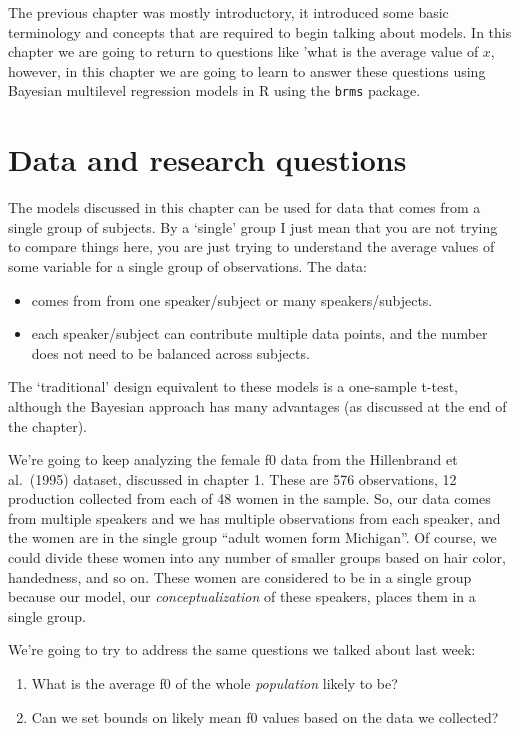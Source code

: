 \documentclass[
]{book}
\providecommand{\tightlist}{%
  \setlength{\itemsep}{0pt}\setlength{\parskip}{0pt}}
\begin{document}
The previous chapter was mostly introductory, it introduced some basic terminology and concepts that are required to begin talking about models. In this chapter we are going to return to questions like 'what is the average value of \(x\), however, in this chapter we are going to learn to answer these questions using Bayesian multilevel regression models in R using the \texttt{brms} package.

\hypertarget{data-and-research-questions-1}{%
\section{Data and research questions}\label{data-and-research-questions-1}}

The models discussed in this chapter can be used for data that comes from a single group of subjects. By a `single' group I just mean that you are not trying to compare things here, you are just trying to understand the average values of some variable for a single group of observations. The data:

\begin{itemize}
\tightlist
\item
  comes from from one speaker/subject or many speakers/subjects.
\item
  each speaker/subject can contribute multiple data points, and the number does not need to be balanced across subjects.
\end{itemize}

The `traditional' design equivalent to these models is a one-sample t-test, although the Bayesian approach has many advantages (as discussed at the end of the chapter).

We're going to keep analyzing the female f0 data from the Hillenbrand et al.~(1995) dataset, discussed in chapter 1. These are 576 observations, 12 production collected from each of 48 women in the sample. So, our data comes from multiple speakers and we has multiple observations from each speaker, and the women are in the single group ``adult women form Michigan''. Of course, we could divide these women into any number of smaller groups based on hair color, handedness, and so on. These women are considered to be in a single group because our model, our \emph{conceptualization} of these speakers, places them in a single group.

We're going to try to address the same questions we talked about last week:

\begin{enumerate}
\def\labelenumi{\arabic{enumi})}
\item
  What is the average f0 of the whole \emph{population} likely to be?
\item
  Can we set bounds on likely mean f0 values based on the data we collected?
\end{enumerate}
\end{document}
